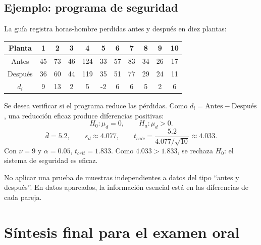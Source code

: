\documentclass[11pt,a4paper]{article}
\begin{document}
\subsection{Ejemplo: programa de seguridad}

La guía registra horas-hombre perdidas antes y después en diez plantas:

\begin{table}[H]
\centering
\small
\begin{tabular}{c*{10}{c}}
\toprule
Planta &1&2&3&4&5&6&7&8&9&10\\
\midrule
Antes &45&73&46&124&33&57&83&34&26&17\\
Después&36&60&44&119&35&51&77&29&24&11\\
$d_i$ &9&13&2&5&-2&6&6&5&2&6\\
\bottomrule
\end{tabular}
\end{table}

Se desea verificar si el programa reduce las pérdidas. Como $d_i=\text{Antes}-\text{Después}$, una reducción eficaz produce diferencias positivas:
\[
H_0:\mu_d=0,
\qquad
H_a:\mu_d>0.
\]
\[
\bar d=5.2,
\qquad s_d\approx4.077,
\qquad
 t_{calc}=\frac{5.2}{4.077/\sqrt{10}}\approx4.033.
\]
Con $\nu=9$ y $\alpha=0.05$, $t_{crit}=1.833$. Como $4.033>1.833$, se rechaza $H_0$: el sistema de seguridad es eficaz.

\begin{errorfrecuente}
No aplicar una prueba de muestras independientes a datos del tipo ``antes y después''. En datos apareados, la información esencial está en las diferencias de cada pareja.
\end{errorfrecuente}

\section{Síntesis final para el examen oral}
\end{document}
